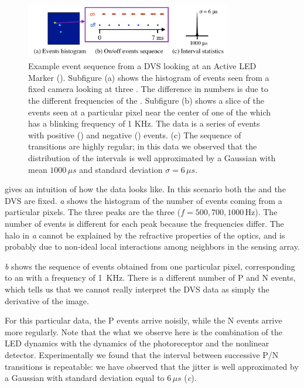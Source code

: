 \begin{figure}[b]
\begin{centering}
\includegraphics[width=9cm]{figures/slides/event_sequence2}
\par\end{centering}

\caption{\label{fig:events-hist}Example event sequence from a DVS looking
at an Active LED Marker (\ALM). Subfigure (a) shows the histogram
of events seen from a fixed camera looking at three \ALMs. The difference
in numbers is due to the different frequencies of the \ALMs. Subfigure
(b) shows a slice of the events seen at a particular pixel near the
center of one of the \ALMs which has a blinking frequency of 1 KHz.
The data is a series of events with positive (\pP) and negative (\pN)
events. (c) The sequence of \pPN transitions are highly regular;
in this data we observed that the distribution of the intervals is
well approximated by a Gaussian with mean $1000\,\mu s$ and standard
deviation $\sigma=6\,\mu s$. }
\end{figure}


 gives an intuition of how the data looks
like. In this scenario both the \ALMs and the DVS are fixed. \emph{a}
shows the histogram of the number of events coming from a particular
pixels. The three peaks are the three \ALMs ($f=500,700,1000\,\mbox{Hz}$).
The number of events is different for each peak because the frequencies
differ. The halo in \emph{a} cannot be
explained by the refractive properties of the optics, and is probably
due to non-ideal local interactions among neighbors in the sensing
array.

\emph{b} shows the sequence of events
obtained from one particular pixel, corresponding to an \ALM  with
a frequency of 1~KHz. There is a different number of P and N events,
which tells us that we cannot really interpret the DVS data as simply
the derivative of the image. 

For this particular data, the P events arrive noisily, while the N
events arrive more regularly. Note that the what we observe here is
the combination of the LED dynamics with the dynamics of the photoreceptor
and the nonlinear detector. Experimentally we found that the interval
between successive P/N transitions is repeatable: we have observed
that the jitter is well approximated by a Gaussian with standard deviation
equal to $6\,\mu s$ (\emph{c}).


